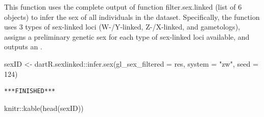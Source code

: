 \documentclass[
  letterpaper,
  DIV=11,
  numbers=noendperiod]{scrreprt}
\newenvironment{Shaded}{\begin{snugshade}}{\end{snugshade}}
\newcommand{\AttributeTok}[1]{\textcolor[rgb]{0.49,0.56,0.16}{#1}}
\newcommand{\DecValTok}[1]{\textcolor[rgb]{0.25,0.63,0.44}{#1}}
\newcommand{\FunctionTok}[1]{\textcolor[rgb]{0.02,0.16,0.49}{#1}}
\newcommand{\NormalTok}[1]{\textcolor[rgb]{0.00,0.44,0.13}{#1}}
\newcommand{\OtherTok}[1]{\textcolor[rgb]{0.00,0.44,0.13}{#1}}
\newcommand{\SpecialCharTok}[1]{\textcolor[rgb]{0.25,0.44,0.63}{#1}}
\newcommand{\StringTok}[1]{\textcolor[rgb]{0.25,0.44,0.63}{#1}}
\let\textttOrig\texttt
\renewcommand{\texttt}[1]{\textttOrig{\color{blue}{#1}}}
\begin{document}
This function uses the complete output of function filter.sex.linked
(list of 6 objects) to infer the sex of all individuals in the dataset.
Specifically, the function uses 3 types of sex-linked loci (W-/Y-linked,
Z-/X-linked, and gametologs), assigns a preliminary genetic sex for each
type of sex-linked loci available, and outputs an \texttt{agreed\ sex}.

\begin{Shaded}
\begin{Highlighting}[]
\NormalTok{sexID }\OtherTok{\textless{}{-}}\NormalTok{ dartR.sexlinked}\SpecialCharTok{::}\FunctionTok{infer.sex}\NormalTok{(}\AttributeTok{gl\_sex\_filtered =}\NormalTok{ res, }\AttributeTok{system =} \StringTok{"zw"}\NormalTok{,}
    \AttributeTok{seed =} \DecValTok{124}\NormalTok{)}
\end{Highlighting}
\end{Shaded}

\begin{verbatim}
***FINISHED***
\end{verbatim}

\begin{Shaded}
\begin{Highlighting}[]
\NormalTok{knitr}\SpecialCharTok{::}\FunctionTok{kable}\NormalTok{(}\FunctionTok{head}\NormalTok{(sexID))}
\end{Highlighting}
\end{Shaded}
\end{document}
